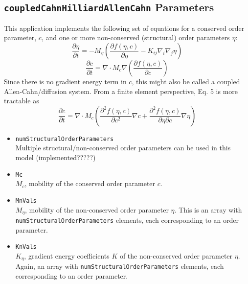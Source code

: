 \documentclass[11pt]{article} %
\begin{document}
\subsection{\texttt{coupledCahnHilliardAllenCahn} Parameters}
This application implements the following set of equations for a conserved order parameter, $c$, and one or more non-conserved (structural) order parameters $\eta$:
\begin{equation}
\frac{\partial \eta}{\partial t} = -M_\eta \left( \frac{\partial f(\eta,c)}{\partial \eta} - K_{ij} \nabla_i \nabla_j \eta \right)
\end{equation}
\begin{equation}
\frac{\partial c}{\partial t} = \nabla \cdot M_c \nabla \left( \frac{\partial f(\eta,c)}{\partial c} \right)
\end{equation}
Since there is no gradient energy term in $c$, this might also be called a coupled Allen-Cahn/diffusion system.  From a finite element perspective, Eq. 5 is more tractable as
\begin{equation}
\frac{\partial c}{\partial t} = \nabla \cdot M_c \left( \frac{\partial^2 f(\eta,c)}{\partial c^2} \nabla c + \frac{\partial^2 f(\eta,c)}{\partial \eta \partial c } \nabla \eta \right)
\end{equation}
\begin{itemize}
\item \texttt{numStructuralOrderParameters}\\
	Multiple structural/non-conserved order parameters can be used in this model (implemented?????)
\item \texttt{Mc} \\
	$M_c$, mobility of the conserved order parameter $c$.
\item \texttt{MnVals} \\
	$M_\eta$, mobility of the non-conserved order parameter $\eta$.  This is an array with \texttt{numStructuralOrderParameters} elements, each corresponding to an order parameter.
\item \texttt{KnVals} \\
	$K_\eta$, gradient energy coefficients $K$ of the non-conserved order parameter $\eta$.  Again, an array with \texttt{numStructuralOrderParameters} elements, each corresponding to an order parameter.
\end{itemize}
\end{document}

